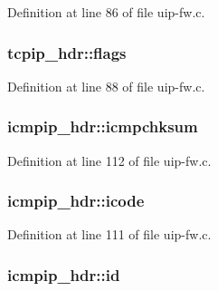 Definition at line 86 of file uip-\/fw.c.

\hypertarget{group__uipfw_ga5699a8989a6d01adf59c4984cae06a67}{
\subsubsection[{flags}]{ {\bf tcpip\_\-hdr::flags}}}
\label{group__uipfw_ga5699a8989a6d01adf59c4984cae06a67}


Definition at line 88 of file uip-\/fw.c.

\hypertarget{group__uipfw_ga25d4408e0b5b761b331e77a0a9b38808}{
\subsubsection[{icmpchksum}]{ {\bf icmpip\_\-hdr::icmpchksum}}}
\label{group__uipfw_ga25d4408e0b5b761b331e77a0a9b38808}


Definition at line 112 of file uip-\/fw.c.

\hypertarget{group__uipfw_gaf4ca6ef37e95662c8cb40bc373d52b50}{
\subsubsection[{icode}]{ {\bf icmpip\_\-hdr::icode}}}
\label{group__uipfw_gaf4ca6ef37e95662c8cb40bc373d52b50}


Definition at line 111 of file uip-\/fw.c.

\hypertarget{group__uipfw_ga933404ce6860a391e841f9829551df0e}{
\subsubsection[{id}]{ {\bf icmpip\_\-hdr::id}}}
\label{group__uipfw_ga933404ce6860a391e841f9829551df0e}


